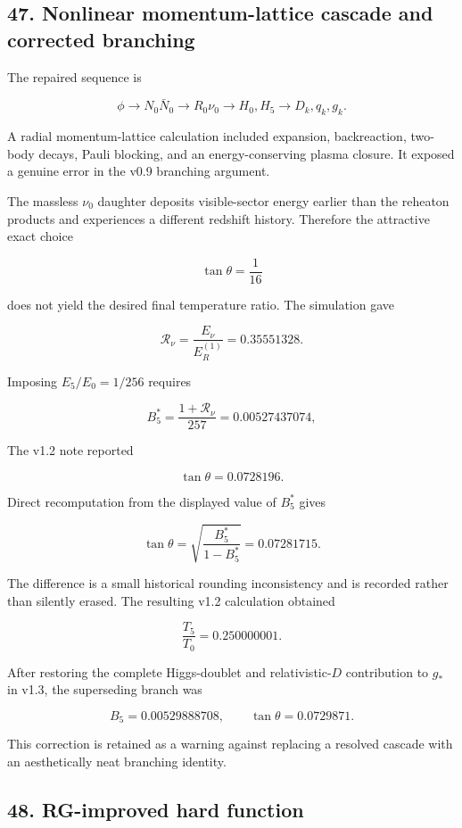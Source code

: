 \documentclass[
]{article}
\begin{document}
\subsection{47. Nonlinear momentum-lattice cascade and corrected
branching}\label{nonlinear-momentum-lattice-cascade-and-corrected-branching}

The repaired sequence is

\[
\phi\rightarrow N_0\bar N_0
\rightarrow R_0\nu_0
\rightarrow H_0,H_5
\rightarrow D_k,q_k,g_k.
\]

A radial momentum-lattice calculation included expansion, backreaction,
two-body decays, Pauli blocking, and an energy-conserving plasma
closure. It exposed a genuine error in the v0.9 branching argument.

The massless \(\nu_0\) daughter deposits visible-sector energy earlier
than the reheaton products and experiences a different redshift history.
Therefore the attractive exact choice

\[
\tan\theta=\frac1{16}
\]

does not yield the desired final temperature ratio. The simulation gave

\[
\mathcal R_\nu
=\frac{E_\nu}{E_R^{(1)}}
=0.35551328.
\]

Imposing \(E_5/E_0=1/256\) requires

\[
\boxed{
B_5^*=\frac{1+\mathcal R_\nu}{257}
=0.00527437074,
}
\]

The v1.2 note reported

\[
\tan\theta=0.0728196.
\]

Direct recomputation from the displayed value of \(B_5^*\) gives

\[
\tan\theta
=\sqrt{\frac{B_5^*}{1-B_5^*}}
=0.07281715.
\]

The difference is a small historical rounding inconsistency and is
recorded rather than silently erased. The resulting v1.2 calculation
obtained

\[
\frac{T_5}{T_0}=0.250000001.
\]

After restoring the complete Higgs-doublet and relativistic-\(D\)
contribution to \(g_*\) in v1.3, the superseding branch was

\[
B_5=0.00529888708,
\qquad
\tan\theta=0.0729871.
\]

This correction is retained as a warning against replacing a resolved
cascade with an aesthetically neat branching identity.

\subsection{48. RG-improved hard
function}\label{rg-improved-hard-function}
\end{document}
